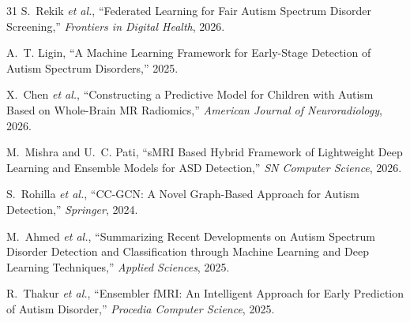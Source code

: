 \documentclass[conference]{IEEEtran}
\begin{document}
\begin{thebibliography}{31}
S.~Rekik \emph{et al.}, ``Federated Learning for Fair Autism Spectrum Disorder Screening,'' \emph{Frontiers in Digital Health}, 2026.

A.~T. Ligin, ``A Machine Learning Framework for Early-Stage Detection of Autism Spectrum Disorders,'' 2025.

X.~Chen \emph{et al.}, ``Constructing a Predictive Model for Children with Autism Based on Whole-Brain MR Radiomics,'' \emph{American Journal of Neuroradiology}, 2026.

M.~Mishra and U.~C. Pati, ``sMRI Based Hybrid Framework of Lightweight Deep Learning and Ensemble Models for ASD Detection,'' \emph{SN Computer Science}, 2026.

S.~Rohilla \emph{et al.}, ``CC-GCN: A Novel Graph-Based Approach for Autism Detection,'' \emph{Springer}, 2024.

M.~Ahmed \emph{et al.}, ``Summarizing Recent Developments on Autism Spectrum Disorder Detection and Classification through Machine Learning and Deep Learning Techniques,'' \emph{Applied Sciences}, 2025.

R.~Thakur \emph{et al.}, ``Ensembler fMRI: An Intelligent Approach for Early Prediction of Autism Disorder,'' \emph{Procedia Computer Science}, 2025.

\end{thebibliography}
\end{document}
